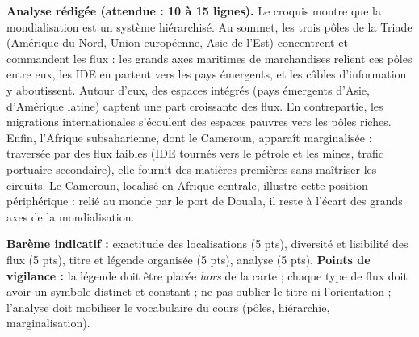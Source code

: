 \documentclass[11pt]{article}
\begin{document}
\begin{corrige}
\textbf{Analyse rédigée (attendue : 10 à 15 lignes).} Le croquis montre que la mondialisation est un système hiérarchisé. Au sommet, les trois pôles de la Triade (Amérique du Nord, Union européenne, Asie de l'Est) concentrent et commandent les flux : les grands axes maritimes de marchandises relient ces pôles entre eux, les IDE en partent vers les pays émergents, et les câbles d'information y aboutissent. Autour d'eux, des espaces intégrés (pays émergents d'Asie, d'Amérique latine) captent une part croissante des flux. En contrepartie, les migrations internationales s'écoulent des espaces pauvres vers les pôles riches. Enfin, l'Afrique subsaharienne, dont le Cameroun, apparaît marginalisée : traversée par des flux faibles (IDE tournés vers le pétrole et les mines, trafic portuaire secondaire), elle fournit des matières premières sans maîtriser les circuits. Le Cameroun, localisé en Afrique centrale, illustre cette position périphérique : relié au monde par le port de Douala, il reste à l'écart des grands axes de la mondialisation.

\textbf{Barème indicatif :} exactitude des localisations (5 pts), diversité et lisibilité des flux (5 pts), titre et légende organisée (5 pts), analyse (5 pts).
\textbf{Points de vigilance :} la légende doit être placée \emph{hors} de la carte ; chaque type de flux doit avoir un symbole distinct et constant ; ne pas oublier le titre ni l'orientation ; l'analyse doit mobiliser le vocabulaire du cours (pôles, hiérarchie, marginalisation).
\end{corrige}
\end{document}
